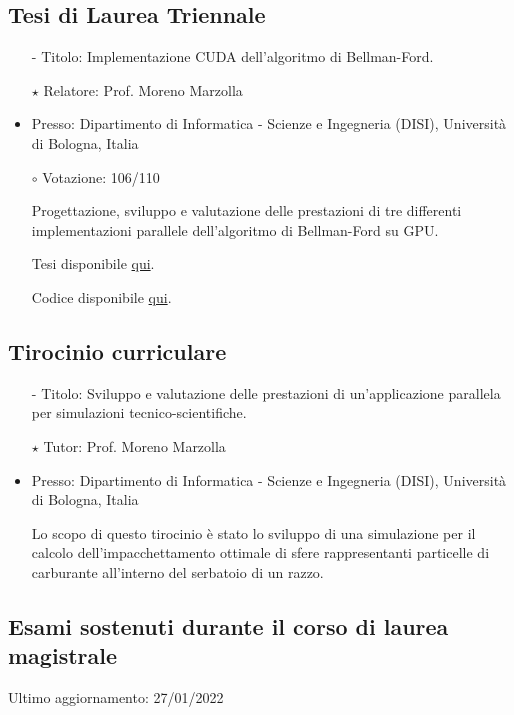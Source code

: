 \documentclass[curriculum-vitae-ita]{subfiles}
\begin{document}
		\subsection*{Tesi di Laurea Triennale}
			\begin{itemize}
				\item[-] {\large Titolo:} Implementazione CUDA dell'algoritmo di Bellman-Ford.
				\item[$\star$] {\large Relatore:} Prof. Moreno Marzolla
				\item {\large Presso:} Dipartimento di Informatica - Scienze e Ingegneria (DISI), Università di Bologna, Italia
				\item[$\circ$] {\large Votazione:} 106/110
				\item[] Progettazione, sviluppo e valutazione delle prestazioni di tre differenti implementazioni parallele dell'algoritmo di Bellman-Ford su GPU.
				\item[] Tesi disponibile \href{https://amslaurea.unibo.it/24313}{qui}.
				\item[] Codice disponibile \href{https://github.com/Ledmington/bellman-ford-cuda}{qui}.
			\end{itemize}
		
		\subsection*{Tirocinio curriculare}
			\begin{itemize}
				\item[-] {\large Titolo:} Sviluppo e valutazione delle prestazioni di un'applicazione parallela per simulazioni tecnico-scientifiche.
				\item[$\star$] {\large Tutor:} Prof. Moreno Marzolla
				\item {\large Presso:} Dipartimento di Informatica - Scienze e Ingegneria (DISI), Università di Bologna, Italia
				\item[] Lo scopo di questo tirocinio è stato lo sviluppo di una simulazione per il calcolo dell'impacchettamento ottimale di sfere rappresentanti particelle di carburante all'interno del serbatoio di un razzo.
			\end{itemize}
		
		\subsection*{Esami sostenuti durante il corso di laurea magistrale}
			{\small Ultimo aggiornamento: 27/01/2022}
			\medskip
			
			\begin{minipage}[t]{.47\textwidth}
			\end{minipage}
			\hfill
			\begin{minipage}[t]{.47\textwidth}
			\end{minipage}
\end{document}
